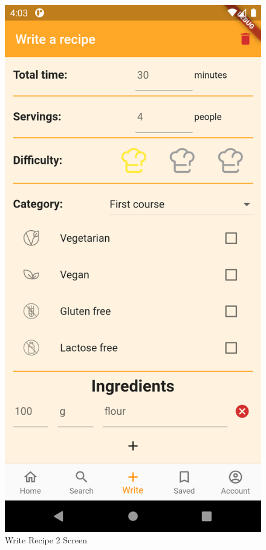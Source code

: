 \begin{figure}[H]
	\begin{minipage}{0.31\textwidth}
		\centering
		\includegraphics[width = .7\linewidth]{img/Write_2.png}
		\caption{Write Recipe 2 Screen}
	\end{minipage}\hfill
	\begin{minipage}{0.31\textwidth}
		\centering

\end{minipage}
\end{figure}
